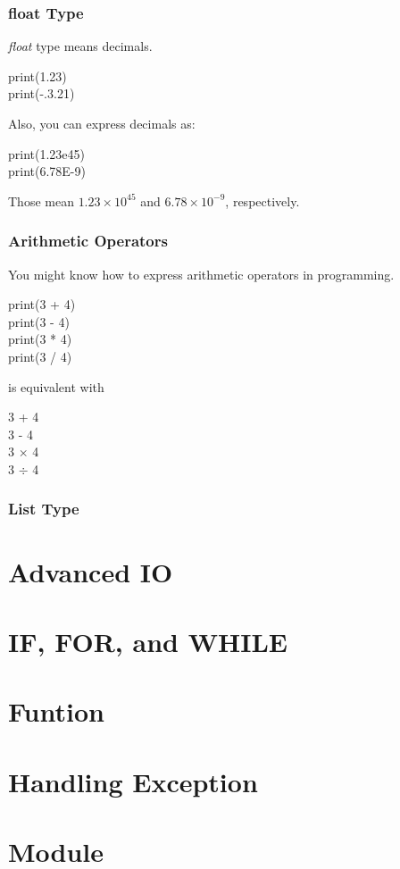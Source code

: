 \documentclass{beamer}
\begin{document}
	\begin{frame}
		\frametitle{float Type}
		\textit{float} type means decimals.
		\begin{example}
			print(1.23) \\
			print(-.3.21)
		\end{example}
		Also, you can express decimals as:
		\begin{example}
			print(1.23e45) \\
			print(6.78E-9)
		\end{example}
		Those mean $1.23 \times 10^{45}$ and $6.78 \times 10^{-9}$, respectively.
	\end{frame}

	\begin{frame}
		\frametitle{Arithmetic Operators}
		You might know how to express arithmetic operators in programming.
		\begin{example}
			print(3 + 4) \\
			print(3 - 4) \\
			print(3 * 4) \\
			print(3 / 4) 
		\end{example}
	
		is equivalent with
		
		\begin{example}
			3 + 4 \\
			3 - 4 \\
			3 $\times$ 4 \\
			3 $\div$ 4
		\end{example}
	\end{frame}

	\begin{frame}
		\frametitle{List Type}
	\end{frame}
		
	\section{Advanced IO}
	
	\section{IF, FOR, and WHILE}

	\section{Funtion}
	
	\section{Handling Exception}
	
	\section{Module}
\end{document}
